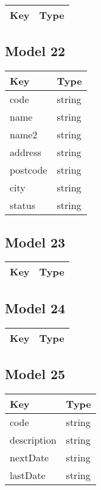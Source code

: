 \documentclass[10pt]{article}
\begin{document}
            \begin{tabularx}{\textwidth}{lZ}
                \textbf{Key} & \textbf{Type} \\
                \hline
            \end{tabularx}
            \subsection{Model 22}
            
            \begin{tabularx}{\textwidth}{lZ}
                \textbf{Key} & \textbf{Type} \\
                \hline
                    code & string \\
                    name & string \\
                    name2 & string \\
                    address & string \\
                    postcode & string \\
                    city & string \\
                    status & string \\
            \end{tabularx}
            \subsection{Model 23}
            
            \begin{tabularx}{\textwidth}{lZ}
                \textbf{Key} & \textbf{Type} \\
                \hline
            \end{tabularx}
            \subsection{Model 24}
            
            \begin{tabularx}{\textwidth}{lZ}
                \textbf{Key} & \textbf{Type} \\
                \hline
            \end{tabularx}
            \subsection{Model 25}
            
            \begin{tabularx}{\textwidth}{lZ}
                \textbf{Key} & \textbf{Type} \\
                \hline
                    code & string \\
                    description & string \\
                    nextDate & string \\
                    lastDate & string \\
            \end{tabularx}
\end{document}
